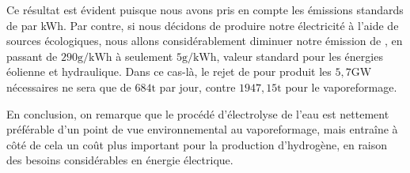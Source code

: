 \documentclass[a4paper, oneside, 12pt]{article}
\begin{document}
Ce résultat est évident puisque nous avons pris en compte 
les émissions standards de  par kWh.
Par contre, si nous décidons de produire notre électricité à l'aide de sources écologiques,
nous allons considérablement diminuer notre émission de , 
en passant de $290\si{\gram/\kilo\watt\hour}$ à seulement $5\si{\gram/\kilo\watt\hour}$, 
valeur standard pour les énergies éolienne et hydraulique. 
Dans ce cas-là, le rejet de  pour produit les $5,7\si{\giga\watt}$ nécessaires 
ne sera que de $684\si{\tonne}$ par jour, 
contre $1947,15\si{\tonne}$ pour le vaporeformage. 
\newline

En conclusion, on remarque que le procédé d'électrolyse de l'eau 
est nettement préférable d'un point de vue environnemental au vaporeformage, 
mais entraîne à côté de cela un coût plus important pour la production d'hydrogène,
en raison des besoins considérables en énergie électrique.

\printbibliography
\end{document}
